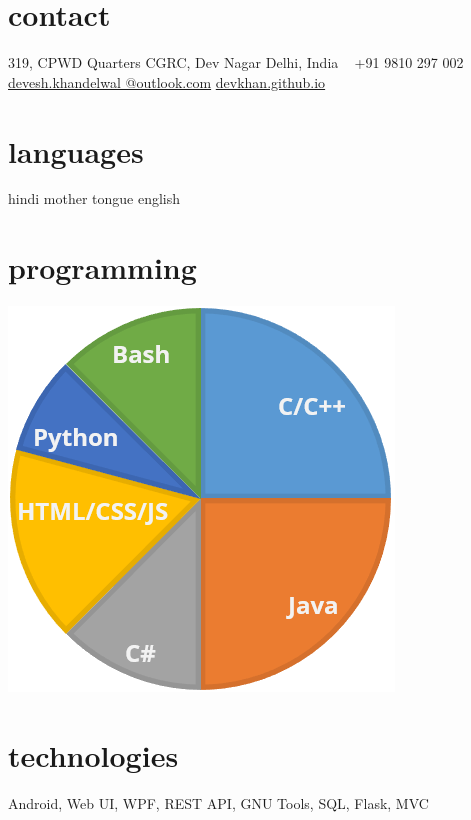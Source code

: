 \documentclass[]{devkhan-cv} %
\begin{document}


\begin{aside} %
	\section{contact}
		319, CPWD Quarters
		CGRC, Dev Nagar
		Delhi, India
		~
		+91 9810 297 002
		~
		\href{mailto:devesh.khandelwal@outlook.com}{devesh.khandelwal
			@outlook.com}
		\href{http://devkhan.github.io}{devkhan.github.io}
	\section{languages}
		hindi mother tongue
		english
	\section{programming}
		\includegraphics[scale=0.35]{img/programming.png}
	\section{technologies}
		Android, Web UI, WPF, REST API, GNU Tools, SQL, Flask, MVC
\end{aside}
\end{document}
